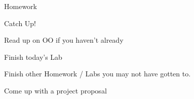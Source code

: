 \documentclass{beamer}
\begin{document}
\begin{frame}[fragile]{Homework}

{\LARGE Catch Up!}

\vfill
{\Large Read up on OO if you haven't already}

\vfill
{\Large Finish today's Lab}

\vfill
{\Large Finish other Homework / Labs you may not have gotten to.}

\vfill
{\Large Come up with a project proposal}

\end{frame}
\end{document}
